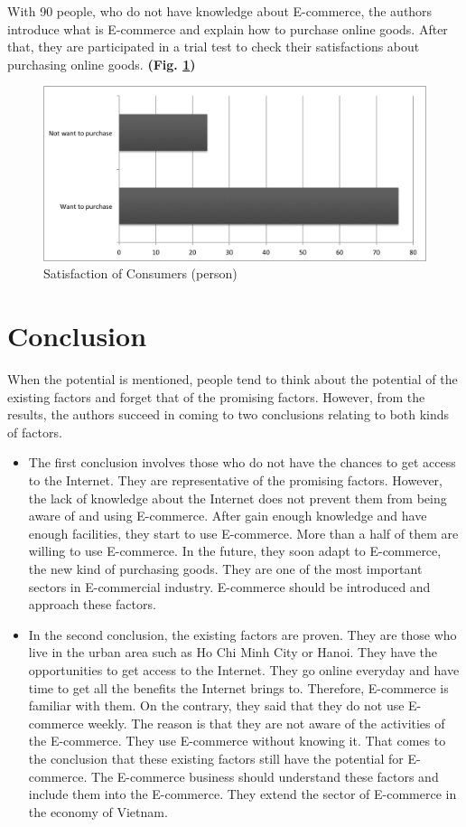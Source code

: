 \documentclass[conference]{IEEEtran}
\begin{document}
With 90 people, who do not have knowledge about E-commerce, the authors introduce what is E-commerce and explain how to purchase online goods. After that, they are participated in a trial test to check their satisfactions about purchasing online goods. \textbf{(Fig. \ref{fig:satisfaction})}

\begin{figure}[tbph]
\centering
\includegraphics[width=0.7\linewidth]{./satisfaction}
\caption{Satisfaction of Consumers (person)}
\label{fig:satisfaction}
\end{figure}






\section{Conclusion}
When the potential is mentioned, people tend to think about the potential of the existing factors and forget that of the promising factors. However, from the results, the authors succeed in coming to two conclusions relating to both kinds of factors.

\begin{itemize}
\item The first conclusion involves those who do not have the chances to get access to the Internet. They are representative of the promising factors. However, the lack of knowledge about the Internet does not prevent them from being aware of and using E-commerce. After gain enough knowledge and have enough facilities, they start to use E-commerce. More than a half of them are willing to use E-commerce. In the future, they soon adapt to E-commerce, the new kind of purchasing goods. They are one of the most important sectors in E-commercial industry. E-commerce should be introduced and approach these factors.
\item In the second conclusion, the existing factors are proven. They are those who live in the urban area such as Ho Chi Minh City or Hanoi. They have the opportunities to get access to the Internet. They go online everyday and have time to get all the benefits the Internet brings to. Therefore, E-commerce is familiar with them. On the contrary, they said that they do not use E-commerce weekly. The reason is that they are not aware of the activities of the E-commerce. They use E-commerce without knowing it. That comes to the conclusion that these existing factors still have the potential for E-commerce. The E-commerce business should understand these factors and include them into the E-commerce. They extend the sector of E-commerce in the economy of Vietnam.

\end{itemize}
\end{document}

